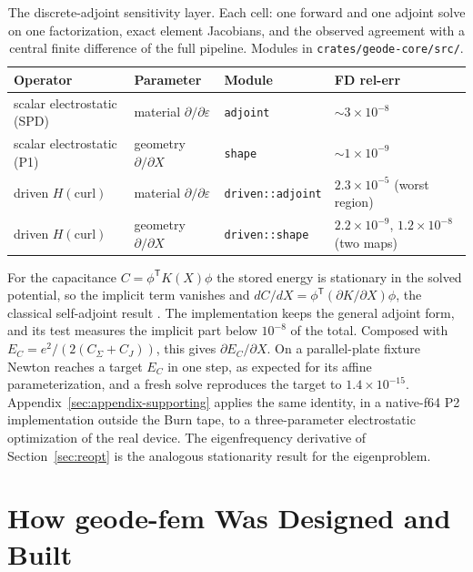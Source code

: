 \documentclass{anvil-paper}
\begin{document}
\begin{table}[tbp]
  \centering
  \caption{The discrete-adjoint sensitivity layer. Each cell: one forward
  and one adjoint solve on one factorization, exact element Jacobians, and
  the observed agreement with a central finite difference of the full
  pipeline. Modules in \texttt{crates/geode-core/src/}.}
  \label{tab:adjoint-matrix}
  \footnotesize
  \begin{tabular}{@{}llll@{}}
    \toprule
    Operator & Parameter & Module & FD rel-err \\
    \midrule
    scalar electrostatic (SPD) & material $\partial/\partial\varepsilon$ &
      \texttt{adjoint} & ${\sim}3\times10^{-8}$ \\
    scalar electrostatic (P1) & geometry $\partial/\partial X$ &
      \texttt{shape} & ${\sim}1\times10^{-9}$ \\
    driven $H(\mathrm{curl})$ & material $\partial/\partial\varepsilon$ &
      \texttt{driven::adjoint} & $2.3\times10^{-5}$ (worst region) \\
    driven $H(\mathrm{curl})$ & geometry $\partial/\partial X$ &
      \texttt{driven::shape} & $2.2\times10^{-9}$, $1.2\times10^{-8}$ (two maps) \\
    \bottomrule
  \end{tabular}
\end{table}

For the capacitance $C = \phi^{\mathsf T}K(X)\phi$ the stored energy is
stationary in the solved potential, so the implicit term vanishes and
$dC/dX = \phi^{\mathsf T}(\partial K/\partial X)\phi$, the classical
self-adjoint result \citep{park2019continuum}. The implementation keeps
the general adjoint form, and its test measures the implicit part below
$10^{-8}$ of the total. Composed with $E_C = e^2/(2(C_\Sigma + C_J))$,
this gives $\partial E_C/\partial X$. On a parallel-plate fixture Newton
reaches a target $E_C$ in one step, as expected for its affine
parameterization, and a fresh solve reproduces the target to
$1.4\times10^{-15}$. Appendix~\ref{sec:appendix-supporting} applies the
same identity, in a native-f64 P2 implementation outside the Burn tape,
to a three-parameter electrostatic optimization of the real device. The
eigenfrequency derivative of Section~\ref{sec:reopt} is the analogous
stationarity result for the eigenproblem.

\section{How geode-fem Was Designed and Built}
\label{sec:built}
\end{document}
